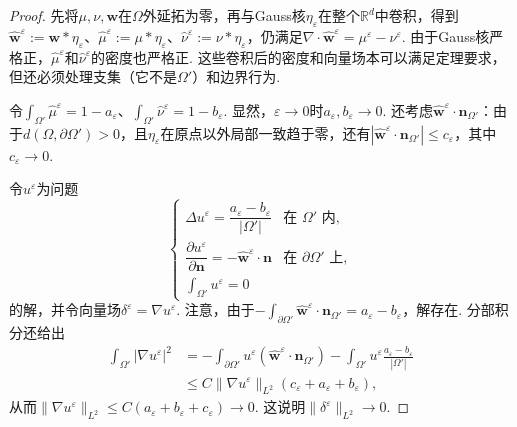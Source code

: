 \begin{proof}
先将$\mu,\nu,\mathbf w$在$\Omega$外延拓为零，再与Gauss核$\eta_\varepsilon$在整个$\mathbb R^d$中卷积，得到$\widehat{\mathbf w}^\varepsilon:=\mathbf w*\eta_\varepsilon$、$\widehat\mu^\varepsilon:=\mu*\eta_\varepsilon$、$\widehat\nu^\varepsilon:=\nu*\eta_\varepsilon$，仍满足$\nabla\cdot\widehat{\mathbf w}^\varepsilon=\mu^\varepsilon-\nu^\varepsilon$. 由于Gauss核严格正，$\widehat\mu^\varepsilon$和$\widehat\nu^\varepsilon$的密度也严格正. 这些卷积后的密度和向量场本可以满足定理要求，但还必须处理支集（它不是$\Omega'$）和边界行为.

令$\int_{\Omega'}\widehat\mu^\varepsilon=1-a_\varepsilon$、$\int_{\Omega'}\widehat\nu^\varepsilon=1-b_\varepsilon$. 显然，$\varepsilon\to0$时$a_\varepsilon,b_\varepsilon\to0$. 还考虑$\widehat{\mathbf w}^\varepsilon\cdot\mathbf n_{\Omega'}$：由于$d(\Omega,\partial\Omega')>0$，且$\eta_\varepsilon$在原点以外局部一致趋于零，还有$|\widehat{\mathbf w}^\varepsilon\cdot\mathbf n_{\Omega'}|\leq c_\varepsilon$，其中$c_\varepsilon\to0$.

令$u^\varepsilon$为问题
\[
 \begin{cases}
 \Delta u^\varepsilon=\dfrac{a_\varepsilon-b_\varepsilon}{|\Omega'|}
           &\text{在 }\Omega'\text{ 内},\\[3pt]
 \dfrac{\partial u^\varepsilon}{\partial\mathbf n}
       =-\widehat{\mathbf w}^\varepsilon\cdot\mathbf n
           &\text{在 }\partial\Omega'\text{ 上},\\[3pt]
 \displaystyle\int_{\Omega'}u^\varepsilon=0
 \end{cases}
\]
的解，并令向量场$\delta^\varepsilon=\nabla u^\varepsilon$. 注意，由于$-\int_{\partial\Omega'}\widehat{\mathbf w}^\varepsilon\cdot\mathbf n_{\Omega'}=a_\varepsilon-b_\varepsilon$，解存在. 分部积分还给出
\begin{equation*}
\begin{aligned}
 \int_{\Omega'}|\nabla u^\varepsilon|^2
 &=-\int_{\partial\Omega'}u^\varepsilon
                  (\widehat{\mathbf w}^\varepsilon\cdot\mathbf n_{\Omega'})
   -\int_{\Omega'}u^\varepsilon\frac{a_\varepsilon-b_\varepsilon}{|\Omega'|}\\
 &\leq C\|\nabla u^\varepsilon\|_{L^2}(c_\varepsilon+a_\varepsilon+b_\varepsilon),
\end{aligned}
\end{equation*}
从而$\|\nabla u^\varepsilon\|_{L^2}\leq C(a_\varepsilon+b_\varepsilon+c_\varepsilon)\to0$. 这说明$\|\delta^\varepsilon\|_{L^2}\to0$.


\end{proof}
